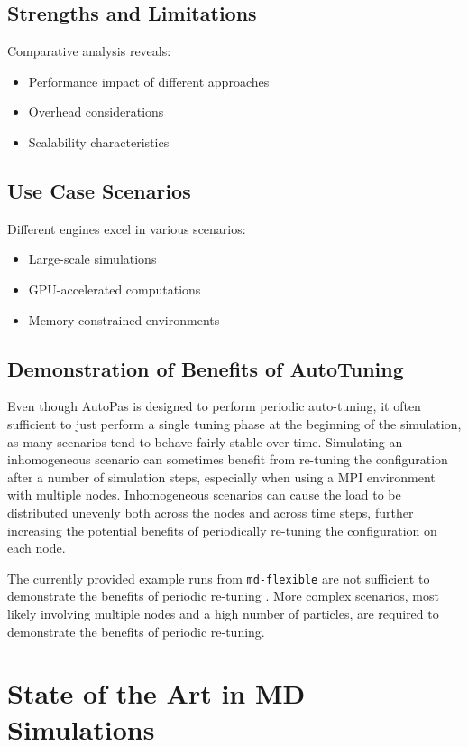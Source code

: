 \documentclass[conference]{IEEEtran}
\begin{document}
\subsection{Strengths and Limitations}
Comparative analysis reveals:
\begin{itemize}
    \item Performance impact of different approaches
    \item Overhead considerations
    \item Scalability characteristics
\end{itemize}

\subsection{Use Case Scenarios}
Different engines excel in various scenarios:
\begin{itemize}
    \item Large-scale simulations
    \item GPU-accelerated computations
    \item Memory-constrained environments
\end{itemize}

\subsection{Demonstration of Benefits of AutoTuning}

Even though AutoPas is designed to perform periodic auto-tuning, it often sufficient to just perform a single tuning phase at the beginning of the simulation, as many scenarios tend to behave fairly stable over time.
Simulating an inhomogeneous scenario can sometimes benefit from re-tuning the configuration after a number of simulation steps, especially when using a MPI environment with multiple nodes. Inhomogeneous scenarios can cause the load to be distributed unevenly both across the nodes and across time steps, further increasing the potential benefits of periodically re-tuning the configuration on each node.

The currently provided example runs from \texttt{md-flexible} are not sufficient to demonstrate the benefits of periodic re-tuning . More complex scenarios, most likely involving multiple nodes and a high number of particles, are required to demonstrate the benefits of periodic re-tuning.


\section{State of the Art in MD Simulations}
\end{document}
